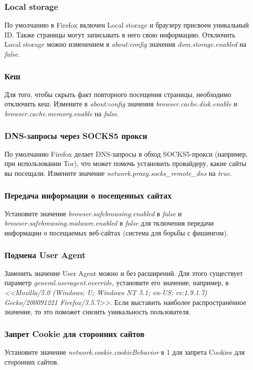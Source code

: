 \subsubsection{Local storage}
По умолчанию в Firefox включен Local storage и браузеру присвоен уникальный ID. Также страницы могут записывать в него свою информацию. Отключить Local storage можно изменением в \textit{about:config} значения \textit{dom.storage.enabled} на \textit{false}.
\subsubsection{Кеш}
Для того, чтобы скрыть факт повторного посещения страницы, необходимо отключить кеш. Измените в \textit{about:config} значения \textit{browser.cache.disk.enable} и \textit{browser.cache.memory.enable} на \textit{false}.
\subsubsection{DNS-запросы через SOCKS5 прокси}
По умолчанию Firefox делает DNS-запросы в обход SOCKS5-прокси (например, при использовании Tor), что может помочь установить провайдеру, какие сайты вы посещали. Измените значение \textit{network.proxy.socks\_remote\_dns} на \textit{true}.
\subsubsection{Передача информации о посещенных сайтах}
Установите значение \textit{browser.safebrowsing.enabled} в \textit{false} и \textit{browser.safebrowsing.malware.enabled} в \textit{false} для тключения передачи информации о посещаемых веб-сайтах (система для борьбы с фишингом).
\subsubsection{Подмена User Agent}
Заменить значение User Agent можно и без расширений. Для этого существует параметр \textit{general.useragent.override}, установите его значение, например, в  \textit{<<Mozilla/5.0 (Windows; U; Windows NT 5.1; en-US; rv:1.9.1.7) Gecko/200091221 Firefox/3.5.7>>}. Если выставить наиболее распространённое значение, то это поможет снизить уникальность пользователя.
\subsubsection{Запрет Cookie для сторонних сайтов}
Установите значение \textit{network.cookie.cookieBehavior} в 1 для запрета Cookies для сторонних сайтов.
